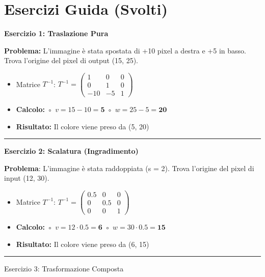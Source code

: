 \documentclass[
]{article}
\author{}
\date{}
\providecommand{\tightlist}{%
  \setlength{\itemsep}{0pt}\setlength{\parskip}{0pt}}
\begin{document}
\hypertarget{esercizi-guida-svolti}{%
\section{Esercizi Guida (Svolti)}\label{esercizi-guida-svolti}}

\textbf{Esercizio 1: Traslazione Pura}

\textbf{Problema:} L'immagine è stata spostata di +10 pixel a destra e +5 in basso. Trova l'origine del pixel di output (15, 25).

\begin{itemize}
\tightlist
\item
  Matrice \(T^{-1}\):
  \(T^{-1} = \begin{pmatrix} 1 & 0 & 0 \\ 0 & 1 & 0 \\ -10 & -5 & 1 \end{pmatrix}\)
\item
  \textbf{Calcolo:}
  ◦ \(v = 15 - 10 = \mathbf{5}\)
  ◦ \(w = 25 - 5 = \mathbf{20}\)
\item
  \textbf{Risultato:} Il colore viene preso da (5, 20)
\end{itemize}

\begin{center}\rule{0.5\linewidth}{0.5pt}\end{center}

\textbf{Esercizio 2: Scalatura (Ingradimento)}

\textbf{Problema}: L'immagine è stata raddoppiata (s = 2). Trova l'origine del pixel di input (12, 30).

\begin{itemize}
\tightlist
\item
  Matrice \(T^{-1}\):
  \(T^{-1} = \begin{pmatrix} 0.5 & 0 & 0 \\ 0 & 0.5 & 0 \\ 0 & 0 & 1 \end{pmatrix}\)
\item
  \textbf{Calcolo:}
  ◦ \(v = 12 \cdot 0.5 = \mathbf{6}\)
  ◦ \(w = 30 \cdot 0.5 = \mathbf{15}\)
\item
  \textbf{Risultato:} Il colore viene preso da (6, 15)
\end{itemize}

\begin{center}\rule{0.5\linewidth}{0.5pt}\end{center}

Esercizio 3: Trasformazione Composta
\end{document}
